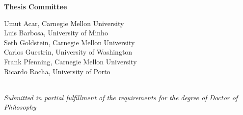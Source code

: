 \begin{center}
\vspace{0.3in}

{\bf
Thesis Committee \\
}

Umut Acar, Carnegie Mellon University\\
Luis Barbosa, University of Minho\\
Seth Goldstein, Carnegie Mellon University\\
Carlos Guestrin, University of Washington\\
Frank Pfenning, Carnegie Mellon University\\
Ricardo Rocha, University of Porto\\\
\vspace{0.4in}

\emph{Submitted in partial fulfillment of the requirements for the degree of Doctor of Philosophy}

\end{center}




